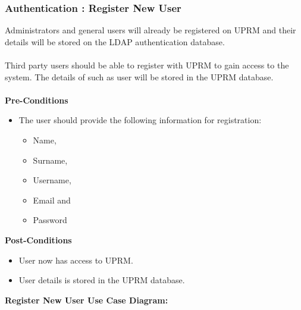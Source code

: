 \subsubsection{Authentication : Register New User}
Administrators and general users will already be registered on UPRM and their details will be stored on the LDAP authentication database.\\ \\
Third party users should be able to register with UPRM to gain access to the system. The details of such as user will be stored in the UPRM database.\\ \\
\textbf{Pre-Conditions}
\begin{itemize}
	\item The user should provide the following information for registration:
	\begin{itemize}
		\item Name,
		\item Surname,
		\item Username,
		\item Email and
		\item Password \\
	\end{itemize}
\end{itemize}
\textbf{Post-Conditions}
\begin{itemize}
	\item User now has access to UPRM.
	\item User details is stored in the UPRM database.\\
\end{itemize}
\textbf{Register New User Use Case Diagram:}\\
\centerline{}
